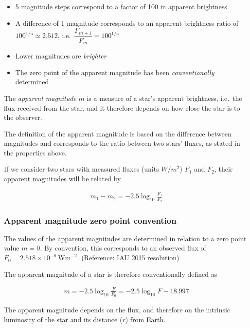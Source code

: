 \documentclass[
  letterpaper,
  DIV=11,
  numbers=noendperiod]{scrreprt}
\providecommand{\tightlist}{%
  \setlength{\itemsep}{0pt}\setlength{\parskip}{0pt}}\usepackage{longtable,booktabs,array}
\begin{document}
\begin{itemize}
\tightlist
\item
  5 magnitude steps correspond to a factor of 100 in apparent brightness
\item
  A difference of 1 magnitude corresponds to an apparent brightness
  ratio of \(100^{1/5}\simeq 2.512\),
  i.e.~\(\dfrac{F_{m+1}}{F_m}=100^{1/5}\)
\item
  Lower magnitudes are \emph{brighter}
\item
  The zero point of the apparent magnitude has been
  \emph{conventionally} determined
\end{itemize}

The \emph{apparent magnitude} \(m\) is a measure of a star's apparent
brightness, i.e.~the flux received from the star, and it therefore
depends on how close the star is to the observer.

The definition of the apparent magnitude is based on the difference
between magnitudes and corresponds to the ratio between two stars'
fluxes, as stated in the properties above.

If we consider two stars with measured fluxes (units \(W/m^2\)) \(F_1\)
and \(F_2\), their apparent magnitudes will be related by

\begin{align}
m_1 - m_2 = -2.5 \log_{10} \frac{F_1}{F_2}
\end{align}

\hypertarget{apparent-magnitude-zero-point-convention}{%
\subsubsection{Apparent magnitude zero point
convention}\label{apparent-magnitude-zero-point-convention}}

The values of the apparent magnitudes are determined in relation to a
zero point value \(m=0\). By convention, this corresponds to an observed
flux of \(F_0 = 2.518 × 10^{−8} \ \mathrm{W m}^{−2}\). (Reference: IAU
2015 resolution)

The apparent magnitude of a star is therefore conventionally defined as

\begin{align}
m = -2.5 \log_{10}{\frac{F}{F_0}} = -2.5 \log_{10}{F} - 18.997
\end{align}

The apparent magnitude depends on the flux, and therefore on the
intrinsic luminosity of the star and its distance (\(r\)) from Earth.
\end{document}
